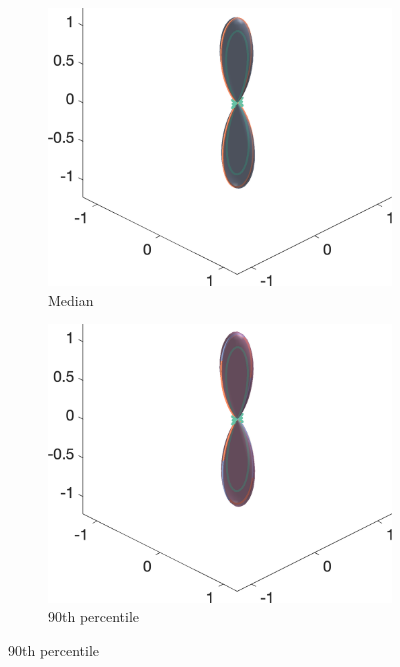 \begin{figure}
{\begin{minipage}[c]{1\textwidth}
\begin{subfigure}[]{0.245\textwidth}
  \end{subfigure}
  \begin{subfigure}[]{0.245\textwidth}
    \caption*{Median}
    \includegraphics[width=\textwidth]{figures/frf_experiment/fibres_fod_3D_kappa100_b_3000n_3}
  \end{subfigure}
  \begin{subfigure}[]{0.245\textwidth}
    \caption*{90th percentile}
    \includegraphics[width=\textwidth]{figures/frf_experiment/fibres_fod_3D_kappa100_b_3000n_4_f1}
  \end{subfigure}
  \end{minipage}
}


\end{figure}
